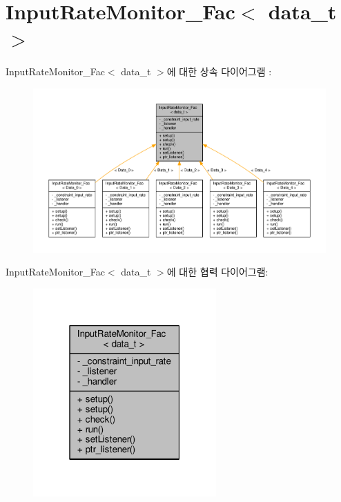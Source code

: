\hypertarget{classInputRateMonitor__Fac}{}\section{Input\+Rate\+Monitor\+\_\+\+Fac$<$ data\+\_\+t $>$}
\label{classInputRateMonitor__Fac}


Input\+Rate\+Monitor\+\_\+\+Fac$<$ data\+\_\+t $>$에 대한 상속 다이어그램 \+: \nopagebreak
\begin{figure}[H]
\begin{center}
\leavevmode
\includegraphics[width=350pt]{classInputRateMonitor__Fac__inherit__graph}
\end{center}
\end{figure}


Input\+Rate\+Monitor\+\_\+\+Fac$<$ data\+\_\+t $>$에 대한 협력 다이어그램\+:\nopagebreak
\begin{figure}[H]
\begin{center}
\leavevmode
\includegraphics[width=199pt]{classInputRateMonitor__Fac__coll__graph}
\end{center}
\end{figure}
